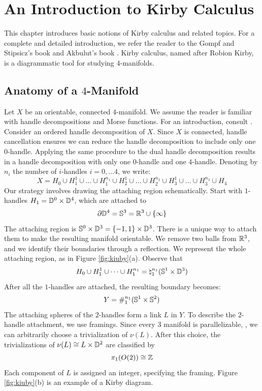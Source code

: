\chapter{An Introduction to Kirby Calculus}
This chapter introduces basic notions of Kirby calculus and related topics. For a complete and detailed introduction, we refer the reader to the Gompf and Stipsicz's book \cite{gompf1999four} and Akbulut's book \cite{akbulut2001four}.
Kirby calculus, named after Robion Kirby, is a diagrammatic tool for studying $4$-manifolds.
\section{Anatomy of a $4$-Manifold}
Let $X$ be an orientable, connected $4$-manifold. We assume the reader is familiar with handle decompositions and Morse functions. For an introduction, consult \cite{benedetti2019lectures}. \\
Consider an ordered handle decomposition of $X$. Since $X$ is connected, handle cancellation ensures we can reduce the handle decomposition to include only one $0$-handle. Applying the same procedure to the dual handle decomposition results in a handle decomposition with only one $0$-handle and one $4$-handle.
Denoting by $n_i$ the number of $i$-handles $i=0,\dots 4$, we write: $$
X = H_0 \cup H_1^1 \cup \dots \cup H_1^{n_1}\cup H_2^1
\cup\dots\cup H_2^{n_2}\cup H_3^1\cup \dots \cup H_3^{n_3} \cup H_4$$
Our strategy involves drawing the attaching region schematically. Start with $1$-handles $H_1 = \mathbb{D}^0 \times \mathbb{D}^4$, which are attached to $$
\partial \mathbb{D}^4 = \mathbb{S}^3 = \mathbb{R}^3 \cup \{\infty\}
$$
The attaching region is $\mathbb{S}^0 \times \mathbb{D}^3 = \{-1, 1\}\times \mathbb{D}^3$.
There is a unique way to attach them to make the resulting manifold orientable.
We remove two balls from $\mathbb{R}^3$, and we identify their boundaries through a reflection. We represent the whole attaching region, as in Figure \ref{fig:kiuby}(a).
Observe that $$
H_0 \cup H_1^1 \cup \dots \cup H_1^{n_1} = \natural_1^{n_1}(\mathbb{S}^1 \times \mathbb{D}^3)
$$After all the $1$-handles are attached, the resulting boundary becomes: $$Y = \#_1^{n_1}(\mathbb{S}^1 \times \mathbb{S}^2)$$
The attaching spheres of the $2$-handles form a link $L$ in $Y$. To describe the $2$-handle attachment, we use framings. Since every $3$ manifold is parallelizable, \cite{benedetti2019lectures}, we can arbitrarily choose a trivialization of $\nu(L)$. After this choice, the trivializations of $\nu(L) \cong L \times \mathbb{D}^2$ are classified by $$
\pi_1(O(2)) \cong \mathbb{Z}
$$Each component of $L$ is assigned an integer, specifying the framing. Figure \ref{fig:kiuby}(b) is an example of a Kirby diagram.

